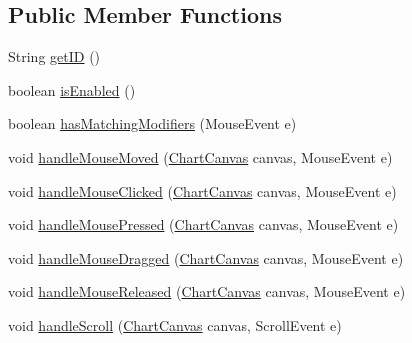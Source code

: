 \subsection*{Public Member Functions}
\begin{DoxyCompactItemize}
\item 
String \mbox{\hyperlink{interfaceorg_1_1jfree_1_1chart_1_1fx_1_1interaction_1_1_mouse_handler_f_x_a7da90cbead6cf1df2d6dacc8e729e69a}{get\+ID}} ()
\item 
boolean \mbox{\hyperlink{interfaceorg_1_1jfree_1_1chart_1_1fx_1_1interaction_1_1_mouse_handler_f_x_a2485249ae77b26b0c7d2099257f0eb80}{is\+Enabled}} ()
\item 
boolean \mbox{\hyperlink{interfaceorg_1_1jfree_1_1chart_1_1fx_1_1interaction_1_1_mouse_handler_f_x_ab34237a86c64205991897825b9761014}{has\+Matching\+Modifiers}} (Mouse\+Event e)
\item 
void \mbox{\hyperlink{interfaceorg_1_1jfree_1_1chart_1_1fx_1_1interaction_1_1_mouse_handler_f_x_a71fb6066ff587b62484100705777fc19}{handle\+Mouse\+Moved}} (\mbox{\hyperlink{classorg_1_1jfree_1_1chart_1_1fx_1_1_chart_canvas}{Chart\+Canvas}} canvas, Mouse\+Event e)
\item 
void \mbox{\hyperlink{interfaceorg_1_1jfree_1_1chart_1_1fx_1_1interaction_1_1_mouse_handler_f_x_aa1761ee25681cfee7de718c887d4ae5e}{handle\+Mouse\+Clicked}} (\mbox{\hyperlink{classorg_1_1jfree_1_1chart_1_1fx_1_1_chart_canvas}{Chart\+Canvas}} canvas, Mouse\+Event e)
\item 
void \mbox{\hyperlink{interfaceorg_1_1jfree_1_1chart_1_1fx_1_1interaction_1_1_mouse_handler_f_x_a0cf92e5a448b58c199fc12dbdbd39aab}{handle\+Mouse\+Pressed}} (\mbox{\hyperlink{classorg_1_1jfree_1_1chart_1_1fx_1_1_chart_canvas}{Chart\+Canvas}} canvas, Mouse\+Event e)
\item 
void \mbox{\hyperlink{interfaceorg_1_1jfree_1_1chart_1_1fx_1_1interaction_1_1_mouse_handler_f_x_a06bbfd28b778bca8ef8caf90174e18f4}{handle\+Mouse\+Dragged}} (\mbox{\hyperlink{classorg_1_1jfree_1_1chart_1_1fx_1_1_chart_canvas}{Chart\+Canvas}} canvas, Mouse\+Event e)
\item 
void \mbox{\hyperlink{interfaceorg_1_1jfree_1_1chart_1_1fx_1_1interaction_1_1_mouse_handler_f_x_adbb7fa38b9913c536fb2a3ae09c70058}{handle\+Mouse\+Released}} (\mbox{\hyperlink{classorg_1_1jfree_1_1chart_1_1fx_1_1_chart_canvas}{Chart\+Canvas}} canvas, Mouse\+Event e)
\item 
void \mbox{\hyperlink{interfaceorg_1_1jfree_1_1chart_1_1fx_1_1interaction_1_1_mouse_handler_f_x_a271047b9229d2fbebbfefe173f153b2e}{handle\+Scroll}} (\mbox{\hyperlink{classorg_1_1jfree_1_1chart_1_1fx_1_1_chart_canvas}{Chart\+Canvas}} canvas, Scroll\+Event e)
\end{DoxyCompactItemize}


